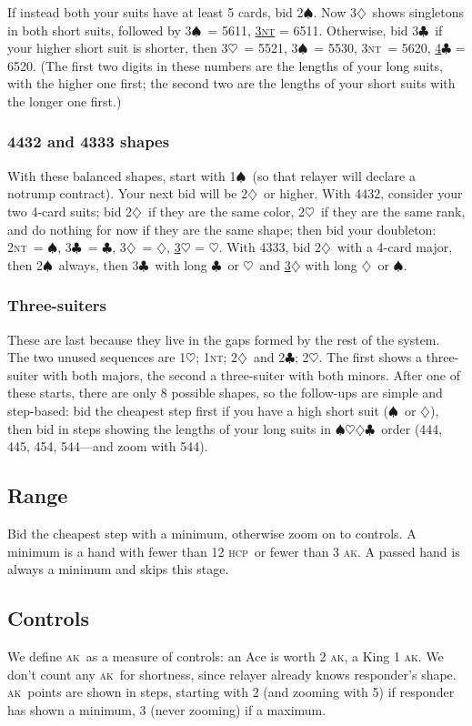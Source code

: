 \documentclass{amsart}
\newcommand{\hcp}{\textsc{hcp}}
\newcommand{\ak}{\textsc{ak}}
\renewcommand{\c}{\ensuremath{\clubsuit}}
\renewcommand{\d}{\ensuremath{\diamondsuit}}
\newcommand{\h}{\ensuremath{\heartsuit}}
\newcommand{\s}{\ensuremath{\spadesuit}}
\newcommand{\nt}{\textsc{nt}}
\newcommand{\+}{\ensuremath{^+}}
\newcommand{\zoom}{\underline}
\begin{document}
If instead both your suits have at least 5 cards, bid 2\s.  Now
3\d\ shows singletons in both short suits, followed by 3\s\ = 5611,
\zoom{3\nt} = 6511.  Otherwise, bid 3\c\ if your higher short suit is
shorter, then 3\h\ = 5521, 3\s\ = 5530, 3\nt\ = 5620, \zoom{4\c} =
6520.  (The first two digits in these numbers are the lengths of your
long suits, with the higher one first; the second two are the lengths
of your short suits with the longer one first.)

\subsubsection*{4432 and 4333 shapes}
With these balanced shapes, start with 1\s\ (so that relayer will
declare a notrump contract).  Your next bid will be 2\d\ or higher.
With 4432, consider your two 4-card suits; bid 2\d\ if they are the
same color, 2\h\ if they are the same rank, and do nothing for now if
they are the same shape; then bid your doubleton: 2\nt\ = \s, 3\c\ =
\c, 3\d\ = \d, \zoom{3\h} = \h.  With 4333, bid 2\d\ with a 4-card
major, then 2\s\ always, then 3\c\ with long \c\ or \h\ and \zoom{3\d}
with long \d\ or \s.

\subsubsection*{Three-suiters}
These are last because they live in the gaps formed by the rest of the
system.  The two unused sequences are 1\h; 1\nt; 2\d\ and 2\c; 2\h.
The first shows a three-suiter with both majors, the second a
three-suiter with both minors.  After one of these starts, there are
only 8 possible shapes, so the follow-ups are simple and step-based:
bid the cheapest step first if you have a high short suit (\s\ or \d),
then bid in steps showing the lengths of your long suits in
\s\h\d\c\ order (444, 445, 454, 544---and zoom with 544).

\subsection*{Range}
Bid the cheapest step with a minimum, otherwise zoom on to controls.
A minimum is a hand with fewer than 12 \hcp\ or fewer than 3 \ak.  A
passed hand is always a minimum and skips this stage.  

\subsection*{Controls}
We define \ak\ as a measure of controls: an Ace is worth 2 \ak, a King
1 \ak.  We don't count any \ak\ for shortness, since relayer already
knows responder's shape.  \ak\ points are shown in steps, starting
with 2 (and zooming with 5) if responder has shown a minimum, 3 (never
zooming) if a maximum.
\end{document}

